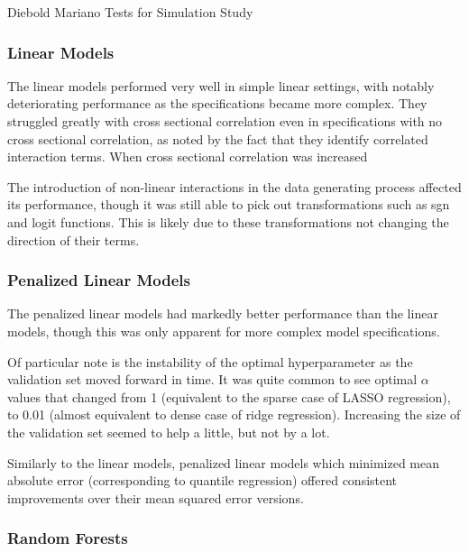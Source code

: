 \documentclass[a4paper, table]{article}
\begin{document}
\begin{table}
	\caption{Diebold Mariano Tests for Simulation Study}
\end{table}




\subsubsection{Linear Models}

The linear models performed very well in simple linear settings, with notably deteriorating performance as the specifications became more complex. They struggled greatly with cross sectional correlation even in specifications with no cross sectional correlation, as noted by the fact that they identify correlated interaction terms. When cross sectional correlation was increased

The introduction of non-linear interactions in the data generating process affected its performance, though it was still able to pick out transformations such as sgn and logit functions. This is likely due to these transformations not changing the direction of their terms.

\subsubsection{Penalized Linear Models}

The penalized linear models had markedly better performance than the linear models, though this was only apparent for more complex model specifications. 

Of particular note is the instability of the optimal hyperparameter as the validation set moved forward in time. It was quite common to see optimal $\alpha$ values that changed from 1 (equivalent to the sparse case of LASSO regression), to 0.01 (almost equivalent to dense case of ridge regression). Increasing the size of the validation set seemed to help a little, but not by a lot. 

Similarly to the linear models, penalized linear models which minimized mean absolute error (corresponding to quantile regression) offered consistent improvements over their mean squared error versions.

\subsubsection{Random Forests}
\end{document}
